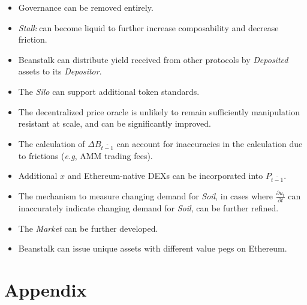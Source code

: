 \documentclass[tikz]{article}
\newcommand{\term}[1]{\textsl{#1}}
\begin{document}
\begin{itemize}
    \item Governance can be removed entirely.
    \item \term{Stalk} can become liquid to further increase composability and decrease friction. 
    \item Beanstalk can distribute yield received from other protocols by \term{Deposited} assets to its \term{Depositor}.
    \item The \term{Silo} can support additional token standards.
    \item The decentralized price oracle is unlikely to remain sufficiently manipulation resistant at scale, and can be significantly improved. 
    \item The calculation of \hyperlink{ht50}{$\Delta B_{\overline{t-1}}$} can account for inaccuracies in the calculation due to frictions (\term{e.g}, AMM trading fees).
    \item Additional \hyperlink{ht223}{$x$} and Ethereum-native DEXs can be incorporated into \hyperlink{ht139}{$P_{\overline{t-1}}$}.
    \item The mechanism to measure changing demand for \term{Soil}, in cases where \hyperlink{ht63}{$\frac{\partial u_t}{\partial t}$} can inaccurately indicate changing demand for \term{Soil}, can be further refined.
    \item The \term{Market} can be further developed.
    \item Beanstalk can issue unique assets with different value pegs on Ethereum.
\end{itemize}

\newpage
\section{Appendix}

\newpage

\newpage

\newpage

\newpage

\newpage

\newpage

\newpage

\newpage

\newpage

\newpage

\newpage
\end{document}
